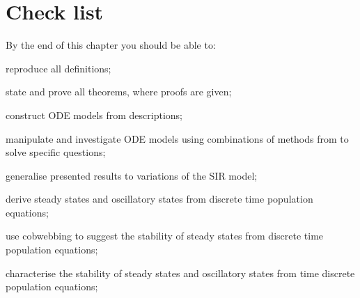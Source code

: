 \section{Check list}
By the end of this chapter you should be able to:
\begin{todolist}
\item reproduce all definitions;
\item state and prove all theorems, where proofs are given;
\item construct ODE models from descriptions;
\item manipulate and investigate ODE models using combinations of methods from  to solve specific questions;
\item generalise presented results to variations of the SIR model;
\item derive steady states and oscillatory states from discrete time population equations;
\item use cobwebbing to suggest the stability of steady states from discrete time population equations;
\item characterise the stability of steady states and oscillatory states from time discrete population equations;
\end{todolist}
